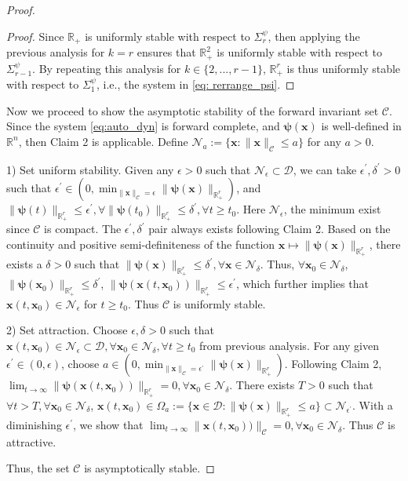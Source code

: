 \documentclass[letterpaper, 10 pt, journal, twoside]{IEEEtran}
\theoremstyle{plain}
\newcommand{\myvar}[1]{\bm{#1}}
\newcommand{\myset}[1]{\mathscr{#1}}
\begin{document}
\begin{proof}
\begin{proof}
    Since $\mathbb{R}_+$ is uniformly stable with respect to $\Sigma_r^\psi$, then applying the previous analysis for $k = r $ ensures that $\mathbb{R}_+^{2}$ is uniformly stable with respect to $\Sigma_{r-1}^\psi$. By repeating this analysis for $k \in \{2,...,r-1\}$,  $\mathbb{R}_{+}^{r}$ is thus uniformly stable with respect to $\Sigma_{1}^{\psi}$, i.e., the system in  \eqref{eq: rerrange_psi}.
  \end{proof}
  
Now we proceed to show the asymptotic stability of the forward invariant set $\myset{C}$. Since the system \eqref{eq:auto_dyn} is forward complete, and  $\myvar{\psi}(\myvar{x})$ is well-defined in $\mathbb{R}^n$, then Claim 2 is applicable. Define $\myset{N}_{a}:=\{ \myvar{x}: \| \myvar{x} \|_{\myset{C}} \leq a\}$ for any $a >0$.

     1) Set uniform stability. Given any $\epsilon>0$ such that $ \myset{N}_{\epsilon} \subset \myset{D}$, we can take $\epsilon^\prime, \delta^\prime >0$ such that $ \epsilon^\prime \in (0,\min_{\|\myvar{x} \|_{\myset{C}} = \epsilon}  \| \myvar{\psi}(\myvar{x}) \|_{\mathbb{R}_{+}^{r}})$, and $ \| \myvar{\psi}(t) \|_{\mathbb{R}_{+}^{r}}\leq \epsilon^\prime, \forall \| \myvar{\psi}(t_0) \|_{\mathbb{R}_{+}^{r}}\leq \delta^\prime, \forall t \ge t_0$.  Here $\myset{N}_{\epsilon}$, the minimum exist since $\myset{C}$ is compact. The $\epsilon^\prime, \delta^\prime$ pair always exists following Claim 2. Based on the continuity and positive semi-definiteness of the function $\myvar{x} \mapsto \| \myvar{\psi}(\myvar{x}) \|_{\mathbb{R}_{+}^{r}}  $, there exists a $ \delta>0$ such that $ \| \myvar{\psi}(\myvar{x}) \|_{\mathbb{R}_{+}^{r}} \leq \delta^\prime, \forall \myvar{x} \in \myset{N}_{\delta}$. Thus, $\forall \myvar{x}_0 \in \myset{N}_{\delta}$, $\| \myvar{\psi}(\myvar{x}_0) \|_{\mathbb{R}_+^r} \leq \delta^\prime$, $\| \myvar{\psi}(\myvar{x}(t,\myvar{x}_0)) \|_{\mathbb{R}_+^r} \leq \epsilon^\prime$, which further implies that $ \myvar{x}(t, \myvar{x}_0) \in \myset{N}_{\epsilon}$ for $t\ge t_0$. Thus $\myset{C}$ is uniformly stable.
     
    2) Set attraction. Choose $\epsilon, \delta >0$ such that  $\myvar{x}(t,\myvar{x}_0) \in \myset{N}_{\epsilon} \subset \myset{D}, \forall \myvar{x}_0\in \myset{N}_{ \delta}, \forall t\ge t_0$ from previous analysis. For any given $\epsilon^\prime \in (0,\epsilon) $, choose $a \in (0,\min_{\|\myvar{x} \|_{\myset{C}} = \epsilon^\prime}  \| \myvar{\psi}(\myvar{x}) \|_{\mathbb{R}_{+}^{r}})$.  Following Claim 2, $\lim_{t\to \infty} \| \myvar{\psi}(\myvar{x}(t,\myvar{x}_0)) \|_{\mathbb{R}_{+}^{r}} = 0, \forall \myvar{x}_0 \in \myset{N}_{\delta}$.  There exists $T>0$ such that $\forall t >T, \forall \myvar{x}_0 \in \myset{N}_{\delta}$, $\myvar{x}(t,\myvar{x}_0) \in \Omega_{a} := \{ \myvar{x}\in \myset{D} : \| \myvar{\psi}(\myvar{x})  \|_{\mathbb{R}_{+}^{r}} \leq a  \} \subset \myset{N}_{\epsilon^\prime} $. With a diminishing $\epsilon^\prime$, we show that $\lim_{t\to \infty} \| \myvar{x}(t,\myvar{x}_0)) \|_{\myset{C}} = 0, \forall \myvar{x}_0 \in \myset{N}_{\delta}$. Thus $\myset{C}$ is attractive.  

  Thus, the set $\myset{C}$ is asymptotically stable.
    \end{proof}
\end{document}
